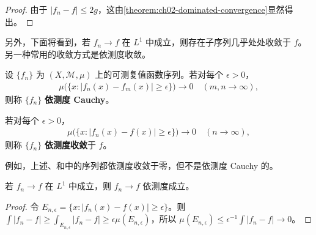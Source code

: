 \documentclass[../../main.tex]{subfiles}%
\begin{document}
\begin{proof}
由于 $|f_n-f|\le2g$，这由\cref{theorem:ch02-dominated-convergence}显然得出。
\end{proof}
另外，下面将看到，若 $f_n\to f$ 在 $L^1$ 中成立，则存在子序列几乎处处收敛于 $f$。另一种常用的收敛方式是依测度收敛。
\begin{definition}\label{definition:ch02-cauchy-in-measure}
设 $\{f_n\}$ 为 $(X,\mathscr{M},\mu)$ 上的可测复值函数序列。若对每个 $\epsilon>0$，
\begin{align*}
\mu\bigl(\{x:|f_n(x)-f_m(x)|\ge\epsilon\}\bigr)\longrightarrow0\quad(m,n\to\infty),
\end{align*}
则称 $\{f_n\}$ \textbf{依测度 Cauchy}。
\end{definition}
\begin{definition}[依测度收敛]\label{definition:ch02-convergence-in-measure}
若对每个 $\epsilon>0$，
\begin{align*}
\mu\bigl(\{x:|f_n(x)-f(x)|\ge\epsilon\}\bigr)\longrightarrow0\quad(n\to\infty),
\end{align*}
则称 $\{f_n\}$ \textbf{依测度收敛}于 $f$。
\end{definition}
\begin{remark}
例如，上述、和中的序列都依测度收敛于零，但不是依测度 Cauchy 的。
\end{remark}
\begin{proposition}\label{proposition:ch02-lone-implies-measure}
若 $f_n\to f$ 在 $L^1$ 中成立，则 $f_n\to f$ 依测度成立。
\end{proposition}
\begin{proof}
令 $E_{n,\epsilon}=\{x:|f_n(x)-f(x)|\ge\epsilon\}$。则 $\int|f_n-f|\ge\int_{E_{n,\epsilon}}|f_n-f|\ge\epsilon\mu(E_{n,\epsilon})$，所以 $\mu(E_{n,\epsilon})\le\epsilon^{-1}\int|f_n-f|\to0$。
\end{proof}
\end{document}
